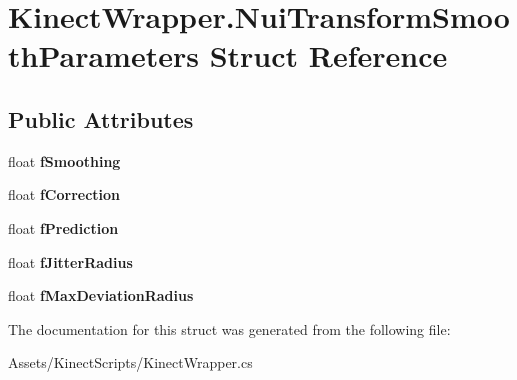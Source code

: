 \hypertarget{struct_kinect_wrapper_1_1_nui_transform_smooth_parameters}{}\section{Kinect\+Wrapper.\+Nui\+Transform\+Smooth\+Parameters Struct Reference}
\label{struct_kinect_wrapper_1_1_nui_transform_smooth_parameters}
\subsection*{Public Attributes}
\begin{DoxyCompactItemize}
\item 
\mbox{\label{struct_kinect_wrapper_1_1_nui_transform_smooth_parameters_aa1bb9b319ef28e03be857f28555657d7}} 
float {\bfseries f\+Smoothing}
\item 
\mbox{\label{struct_kinect_wrapper_1_1_nui_transform_smooth_parameters_a7f6117cf078ffbed9c06c7324c5d28f1}} 
float {\bfseries f\+Correction}
\item 
\mbox{\label{struct_kinect_wrapper_1_1_nui_transform_smooth_parameters_a5539423447d47867e98b526394e24f0d}} 
float {\bfseries f\+Prediction}
\item 
\mbox{\label{struct_kinect_wrapper_1_1_nui_transform_smooth_parameters_a210636c91ed9be0ccca3d6dfd0d4e13c}} 
float {\bfseries f\+Jitter\+Radius}
\item 
\mbox{\label{struct_kinect_wrapper_1_1_nui_transform_smooth_parameters_a35a26e6f9d0df5110a080a80bdaaef55}} 
float {\bfseries f\+Max\+Deviation\+Radius}
\end{DoxyCompactItemize}


The documentation for this struct was generated from the following file\+:\begin{DoxyCompactItemize}
\item 
Assets/\+Kinect\+Scripts/Kinect\+Wrapper.\+cs\end{DoxyCompactItemize}
